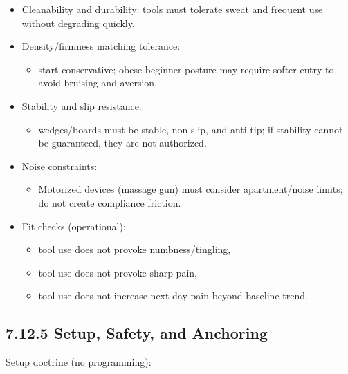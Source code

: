 \documentclass[10pt]{article}
\begin{document}
\begin{itemize}
\item Cleanability and durability: tools must tolerate sweat and frequent use without degrading quickly.
\item Density/firmness matching tolerance:
  \begin{itemize}
  \item start conservative; obese beginner posture may require softer entry to avoid bruising and aversion.
  \end{itemize}
\item Stability and slip resistance:
  \begin{itemize}
  \item wedges/boards must be stable, non-slip, and anti-tip; if stability cannot be guaranteed, they are not authorized.
  \end{itemize}
\item Noise constraints:
  \begin{itemize}
  \item Motorized devices (massage gun) must consider apartment/noise limits; do not create compliance friction.
  \end{itemize}
\item Fit checks (operational):
  \begin{itemize}
  \item tool use does not provoke numbness/tingling,
  \item tool use does not provoke sharp pain,
  \item tool use does not increase next-day pain beyond baseline trend.
  \end{itemize}
\end{itemize}

\subsection*{7.12.5 Setup, Safety, and Anchoring}
{}

Setup doctrine (no programming):
\end{document}
